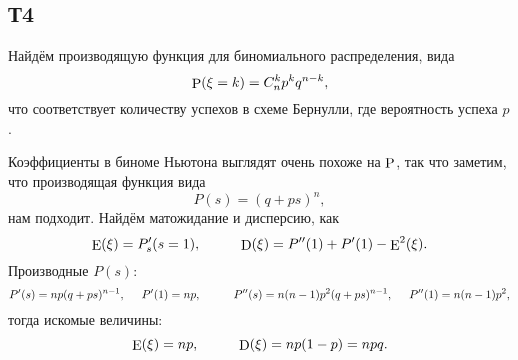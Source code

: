 \subsection*{Т4}


Найдём производящую функция для биномиального распределения, вида
\begin{equation*}
    \P(\xi = k) = C_n^k p^k q^{n-k},
\end{equation*}
что соответствует количеству успехов в схеме Бернулли, где вероятность успеха $p$.

Коэффициенты в биноме Ньютона выглядят очень похоже на $\P$, так что заметим, что производящая функция вида
\begin{equation*}
    P(s) = (q + ps)^n,
\end{equation*}
нам подходит. 
Найдём матожидание и дисперсию, как
\begin{equation*}
    \E(\xi) = P'_s (s= 1),
    \hspace{10 mm}
    \D(\xi) = P''(1) + P'(1) - \E^2(\xi).
\end{equation*}
Производные $P(s)$:
\begin{equation*}
    P'(s) = n p (q + ps)^{n-1}, \hspace{5 mm}  
    P'(1) = n p,
    \hspace{10 mm}
    P''(s) = n (n-1) p^2 (q+ps)^{n-1},
    \hspace{5 mm}
    P''(1) = n (n-1) p^2,
\end{equation*}
тогда искомые величины:
\begin{equation*}
    \E(\xi) = np,
    \hspace{10 mm}
    \D(\xi) = np(1-p) = npq.
\end{equation*}